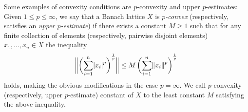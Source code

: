 \documentclass[12pt,leqno]{amsart}
\numberwithin{equation}{section} %
\theoremstyle{definition}
\numberwithin{equation}{section}
\newcommand{\N}{\mathbb{N}}
\newcommand{\Gcal}{\mathcal{G}}
\begin{document}
Some examples of convexity conditions are $p$-convexity and upper $p$-estimates: Given $1\leq p\leq \infty$, we say that a Banach lattice $X$ is \textit{$p$-convex} (respectively, satisfies an \textit{upper $p$-estimate}) if there exists a constant $M\geq 1$ such that for any finite collection of elements (respectively, pairwise disjoint elements) $x_1,\ldots,x_n\in X$ the inequality
\begin{equation*}
	\norm[3]{\intoo[3]{\sum_{i=1}^n \abs{x_i}^p}^{\frac{1}{p}}}\leq M \intoo[3]{\sum_{i=1}^n \norm{x_i}^p}^{\frac{1}{p}}
\end{equation*}
holds, making the obvious modifications in the case $p=\infty$. We call $p$-convexity (respectively, upper $p$-estimate) constant of $X$ to the least constant $M$ satisfying the above inequality. \\%
\end{document}
